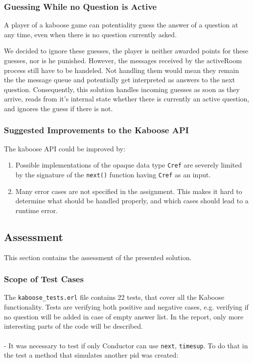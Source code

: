 \documentclass[11pt, a4paper]{article}
\begin{document}
\subsubsection{Guessing While no Question is Active}
A player of a kaboose game can potentiality guess the answer of a question at any time, even when there is no question currently asked.

We decided to ignore these guesses, the player is neither awarded points for these guesses, nor is he punished.
However, the messages received by the activeRoom process still have to be handeled. Not handling them would mean they remain the the message queue and potentially get interpreted as answers to the next question. Consequently, this solution handles incoming guesses as soon as they arrive, reads from it's internal state whether there is currently an active question, and ignores the guess if there is not.

\subsubsection{Suggested Improvements to the Kaboose API}
The kaboose API could be improved by:
\begin{enumerate}
	\item Possible implementations of the opaque data type \texttt{Cref} are severely limited by the signature of the \texttt{next()} function having \texttt{Cref} as an input.
	\item Many error cases are not specified in the assignment. This makes it hard to determine what should be handled properly, and which cases should lead to a runtime error.
\end{enumerate}


\pagebreak
\subsection{Assessment}
This section contains the assessment of the presented solution.


\subsubsection{Scope of Test Cases}
The \texttt{kaboose\_tests.erl} file contains 22 tests, that cover all the Kaboose functionality. Tests are verifying both positive and negative cases, e.g. verifying if no question will be added in case of empty answer list. In the report, only more interesting parts of the code will be described. 
\\
\\
\noindent - It was necessary to test if only Conductor can use  \texttt{next}, \texttt{timesup}. To do that in the test a method that simulates another pid was created:
\end{document}
